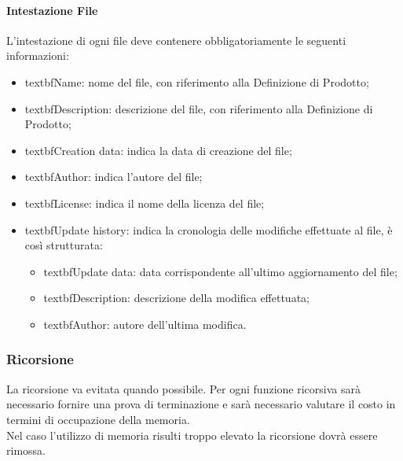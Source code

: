 \documentclass[../NormeDiProgetto.tex]{subfiles}
\begin{document}
                  \paragraph{Intestazione File}
                  L’intestazione di ogni file deve contenere obbligatoriamente le seguenti informazioni:
                  \begin{itemize}
                        \item textbf{Name}: nome del file, con riferimento alla Definizione di Prodotto;
                        \item textbf{Description}: descrizione del file, con riferimento alla Definizione di Prodotto;
                        \item textbf{Creation data}: indica la data di creazione del file;
                        \item textbf{Author}: indica l’autore del file;
                        \item textbf{License}: indica il nome della licenza del file;
                        \item textbf{Update history}: indica la cronologia delle modifiche effettuate al file, è così strutturata:
                              \begin{itemize}
                              \item textbf{Update data}: data corrispondente all’ultimo aggiornamento del file;
                              \item textbf{Description}: descrizione della modifica effettuata;
                              \item textbf{Author}: autore dell’ultima modifica.
                              \end{itemize}
                  \end{itemize}

            \subsubsection{Ricorsione}
            La ricorsione va evitata quando possibile. Per ogni funzione ricorsiva sarà necessario fornire una prova di terminazione e sarà necessario valutare il costo in termini di occupazione della memoria. \\
            Nel caso l'utilizzo di memoria risulti troppo elevato la ricorsione dovrà essere rimossa.
\end{document}
